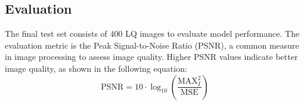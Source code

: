 \subsection{Evaluation}
\label{subsec:evaluation} %

The final test set consists of 400 LQ images to evaluate model performance. The evaluation metric is the Peak Signal-to-Noise Ratio (PSNR), a common measure in image processing to assess image quality. Higher PSNR values indicate better image quality, as shown in the following equation:
\begin{equation}
    \text{PSNR} = 10 \cdot \log_{10} \left( \frac{\text{MAX}_I^2}{\text{MSE}} \right)
    \label{eq:psnr}
\end{equation}
